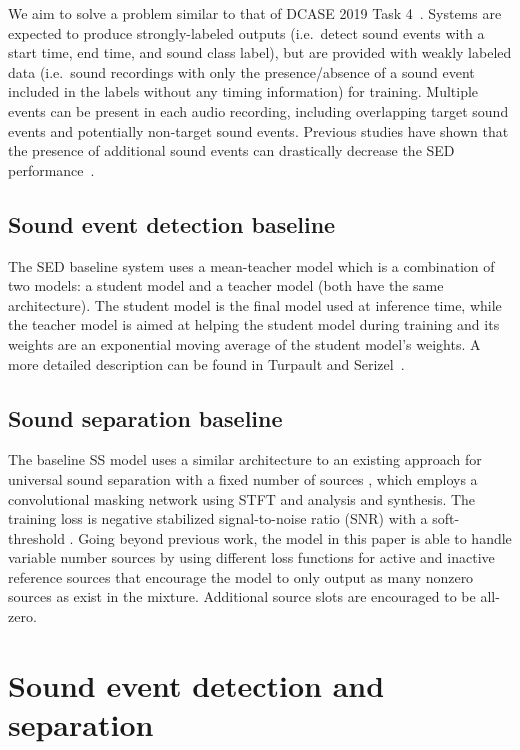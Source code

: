 \documentclass{article}
\begin{document}
\begin{sloppy}
We aim to solve a problem similar to that of DCASE 2019 Task 4~\cite{turpault_2019}. Systems are expected to produce strongly-labeled outputs (i.e.~detect sound events with a start time, end time, and sound class label), but are provided with weakly labeled data (i.e.~sound recordings with only the presence/absence of a sound event included in the labels without any timing information) for training. Multiple events can be present in each audio recording, including overlapping target sound events and potentially non-target sound events. Previous studies have shown that the presence of additional sound events can drastically decrease the SED performance~\cite{serizel_2020}.

\subsection{Sound event detection baseline}
\label{sub:sed_baseline}
The SED baseline system uses a mean-teacher model which is a combination of two models: a student model and a teacher model (both have the same architecture). The student model is the final model used at inference time, while the teacher model is aimed at helping the student model during training and its weights are an exponential moving average of the student model's weights. A more detailed description can be found in Turpault and Serizel~\cite{turpault2020}.

\subsection{Sound separation baseline}
The baseline SS model uses a similar architecture to an existing approach for universal sound separation with a fixed number of sources \cite{kavalerov2019universal, tzinis2020improving}, which employs a convolutional masking network using STFT and analysis and synthesis.
The training loss is negative stabilized signal-to-noise ratio (SNR) \cite{wisdom2020unsupervised} with a soft-threshold .
Going beyond previous work, the model in this paper is able to handle variable number sources by using different loss functions for active and inactive reference sources that encourage the model to only output as many nonzero sources as exist in the mixture. Additional source slots are encouraged to be all-zero.

\section{Sound event detection and separation}


\end{sloppy}
\end{document}
